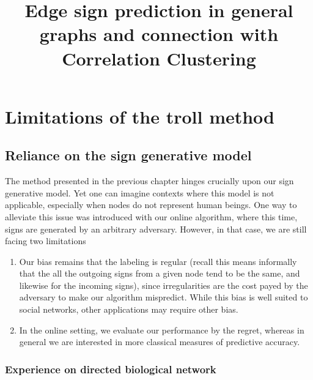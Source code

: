 \documentclass[nobib, a4paper, 10pt, oneside, onecolumn, openany, notitlepage, final,
svgnames, marginals=raggedouter, english,
]{article}
\title{Edge sign prediction in general graphs and connection with Correlation Clustering}
\begin{document}
\maketitle

% 

\section{Limitations of the troll method}
\label{sec:limitations_of_the_troll_method}

\subsection{Reliance on the sign generative model}
\label{sub:reliance_on_the_sign_generative_model}

The method presented in the previous chapter hinges crucially upon our sign generative model. Yet
one can imagine contexts where this model is not applicable, especially when nodes do not represent
human beings. One way to alleviate this issue was introduced with our online algorithm, where this
time, signs are generated by an arbitrary adversary. However, in that case, we are still facing two
limitations
\begin{enumerate}
	\item Our bias remains that the labeling is regular (recall this means informally that the all
		the outgoing signs from a given node tend to be the same, and likewise for the incoming signs),
		since irregularities are the cost payed by the adversary to make our algorithm mispredict. While
		this bias is well suited to social networks, other applications may require other
		bias.
	\item In the online setting, we evaluate our performance by the regret,
		whereas in general we are interested in more classical measures of predictive accuracy.
\end{enumerate}

\subsubsection{Experience on directed biological network}
\label{ssub:experience_on_directed_biological_network}
\end{document}
